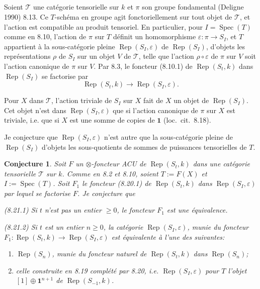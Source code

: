 \documentclass[11pt,a4paper]{article}
\theoremstyle{plain}
\newtheorem{conjecture}[theorem]{Conjecture}
\theoremstyle{definition}
\DeclareMathOperator{\Spec}{Spec}
\DeclareMathOperator{\Rep}{Rep}
\newcommand{\eps}{\varepsilon}
\begin{document}
\subsection{}
Soient $\mathcal{T}$ une cat\'egorie tensorielle sur $k$ et $\pi$ son groupe fondamental (Deligne 1990) 8.13. Ce $T$-sch\'ema en groupe agit fonctoriellement sur tout objet de $\mathcal{T}$, et l'action est compatible au produit tensoriel. En particulier, pour $I = \Spec(T)$ comme en 8.10, l'action de $\pi$ sur $T$ d\'efinit un homomorphisme $\eps : \pi \to S_I$, et $T$ appartient \`a la sous-cat\'egorie pleine $\Rep(S_I, \eps)$ de $\Rep(S_I)$, d'objets les repr\'esentations $\rho$ de $S_I$ sur un objet $V$ de $\mathcal{T}$, telle que l'action $\rho \circ \eps$ de $\pi$ sur $V$ soit l'action canonique de $\pi$ sur $V$. Par 8.3, le foncteur (8.10.1) de $\Rep(S_t, k)$ dans $\Rep(S_I)$ se factorise par
\begin{equation}
\Rep(S_t, k) \to \Rep(S_I, \eps). \tag{8.20.1}
\end{equation}

Pour $X$ dans $\mathcal{T}$, l'action triviale de $S_I$ sur $X$ fait de $X$ un objet de $\Rep(S_I)$. Cet objet n'est dans $\Rep(S_I, \eps)$ que si l'action canonique de $\pi$ sur $X$ est triviale, i.e. que si $X$ est une somme de copies de $\mathbf{1}$ (loc.~cit.~8.18).

Je conjecture que $\Rep(S_I, \eps)$ n'est autre que la sous-cat\'egorie pleine de $\Rep(S_I)$ d'objets les sous-quotients de sommes de puissances tensorielles de $T$.

\begin{conjecture}
Soit $F$ un $\otimes$-foncteur ACU de $\Rep(S_t, k)$ dans une cat\'egorie tensorielle $\mathcal{T}$ sur $k$. Comme en 8.2 et 8.10, soient $T := F(X)$ et $I := \Spec(T)$. Soit $F_1$ le foncteur (8.20.1) de $\Rep(S_t, k)$ dans $\Rep(S_I, \eps)$ par lequel se factorise $F$. Je conjecture que

\textup{(8.21.1)} Si $t$ n'est pas un entier $\geq 0$, le foncteur $F_1$ est une \'equivalence.

\textup{(8.21.2)} Si $t$ est un entier $n \geq 0$, la cat\'egorie $\Rep(S_I, \eps)$, munie du foncteur $F_1 : \Rep(S_t, k) \to \Rep(S_I, \eps)$ est \'equivalente \`a l'une des suivantes:
\begin{enumerate}[label=(\alph*)]
\item $\Rep(S_n)$, munie du foncteur naturel de $\Rep(S_t, k)$ dans $\Rep(S_n)$;
\item celle construite en 8.19 compl\'et\'e par 8.20, i.e. $\Rep(S_I, \eps)$ pour $T$ l'objet $[1] \oplus \mathbf{1}^{n+1}$ de $\Rep(S_{-1}, k)$.
\end{enumerate}
\end{conjecture}
\end{document}

